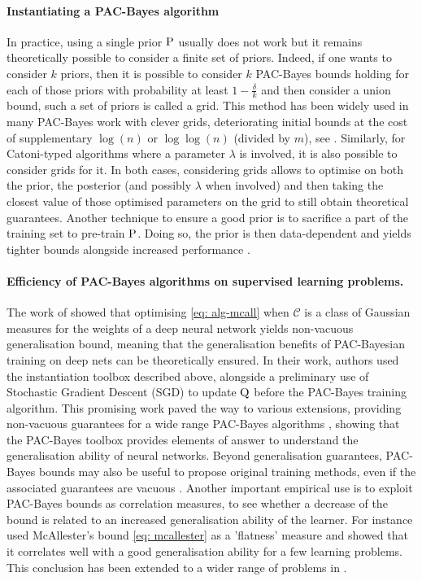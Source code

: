 \paragraph{Instantiating a PAC-Bayes algorithm}
  In practice, using a single prior $\P$ usually does not work but it remains theoretically possible to consider a finite set of priors. Indeed, if one wants to consider $k$ priors, then it is possible to consider $k$ PAC-Bayes bounds holding for each of those priors with probability at least $1-\frac{\delta}{k}$ and then consider a union bound, such a set of priors is called a grid. This method has been widely used in many PAC-Bayes work with clever grids, deteriorating initial bounds at the cost of supplementary $\log(n)$ or $\log\log(n)$ (divided by $m$), see \eg \citet{alquier2024user}. 
  Similarly, for Catoni-typed algorithms where a parameter $\lambda$ is involved, it is also possible to consider grids for it. In both cases, considering grids allows to optimise on both the prior, the posterior (and possibly $\lambda$ when involved) and then taking the closest value of those optimised parameters on the grid to still obtain theoretical guarantees. Another technique to ensure a good prior is to sacrifice a part of the training set to pre-train $\P$. 
  Doing so, the prior is then data-dependent and yields tighter bounds alongside increased performance \citep{perez2021tighter}.

\paragraph{Efficiency of PAC-Bayes algorithms on supervised learning problems.}
The work of \citet{dziugaite2017computing} showed that optimising \eqref{eq: alg-mcall} when $\mathcal{C}$ is a class of Gaussian measures for the weights of a deep neural network yields non-vacuous generalisation bound, meaning that the generalisation benefits of PAC-Bayesian training on deep nets can be theoretically ensured. In their work, authors used the instantiation toolbox described above, alongside a preliminary use of Stochastic Gradient Descent (SGD) to update $\Q$ before the PAC-Bayes training algorithm. This promising work paved the way to various extensions, providing non-vacuous guarantees for a wide range PAC-Bayes algorithms \citep{rivasplata2019pac,letarte2019dichotomize,perezortiz2021learning,perez2021progress,perez2021tighter,dziugaite2021role,biggs2022non,biggs2023tighter}, showing that the PAC-Bayes toolbox provides elements of answer to understand the generalisation ability of neural networks. Beyond generalisation guarantees, PAC-Bayes bounds may also be useful to propose original training methods, even if the associated guarantees are vacuous \citep{biggs2021differentiable,biggs2022margin}. Another important empirical use is to exploit PAC-Bayes bounds as correlation measures, to see whether a decrease of the bound is related to an increased generalisation ability of the learner. For instance \citet{neyshabur2017explor} used McAllester's bound \eqref{eq: mcallester} as a 'flatness' measure and showed that it correlates well with a good generalisation ability for a few learning problems. This conclusion has been extended to a wider range of problems in \citet{jiang2020fantastic,dziugaite2020search}. 
\\
